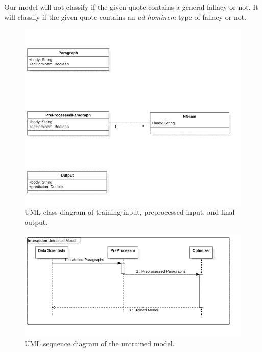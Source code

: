 \documentclass[a4paper]{article}
\begin{document}
Our model will not classify if the given quote contains a general fallacy or not. It will classify if the given quote contains an \emph{ad hominem} type of fallacy or not. 

\begin{figure}
    \includegraphics[width=1\textwidth]{figures/png/Model!Main_0.png}
    \caption{UML class diagram of training input, preprocessed input, and final output.}
    \label{fig:class-diagram}
\end{figure}
 
\begin{figure}
    \includegraphics[width=1\textwidth]{figures/png/Collaboration2!Interaction1!UntrainedModel_2.png}
    \caption{UML sequence diagram of the untrained model.}
    \label{fig:untrained-diagram}
\end{figure}
\end{document}

